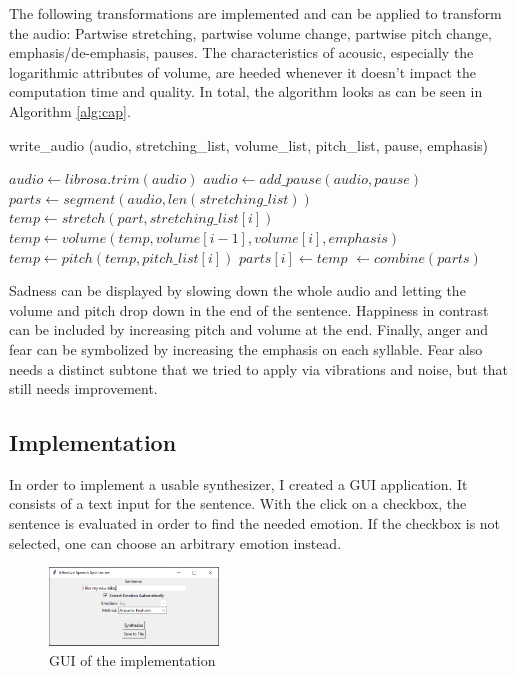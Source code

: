 \documentclass[11pt]{article}
\begin{document}
The following transformations are implemented and can be applied to transform the audio:
Partwise stretching, partwise volume change, partwise pitch change, emphasis/de-emphasis, pauses. The characteristics of acousic, especially the logarithmic attributes of volume, are heeded whenever it doesn't impact the computation time and quality.
In total, the algorithm looks as can be seen in Algorithm \ref{alg:cap}.


\begin{algorithm}
\caption{write\_audio (audio, stretching\_list, volume\_list, pitch\_list, pause, emphasis)}\label{alg:cap}
\begin{algorithmic}
\State $audio \gets librosa.trim(audio)$
	\State $audio  \gets  add\_pause(audio,pause)$
\EndIf
\State $parts \gets segment(audio,len(stretching\_list))$
\State $temp  \gets  stretch(part, stretching\_list[i])$ 
\State $temp \gets volume (temp, volume[i-1], volume[i], emphasis)$
\State $temp \gets pitch (temp, pitch\_list[i])$
\State $parts[i] \gets temp$
\EndFor
\State $\gets combine(parts)$
\end{algorithmic}
\end{algorithm}


Sadness can be displayed by slowing down the whole audio and letting the volume and pitch drop down in the end of the sentence. Happiness in contrast can be included by increasing pitch and volume at the end. Finally, anger and fear can be symbolized by increasing the emphasis on each syllable. Fear also needs a distinct subtone that we tried to apply via vibrations and noise, but that still needs improvement.


\subsection{Implementation}

In order to implement a usable synthesizer, I created a GUI application. It consists of a text input for the sentence. With the click on a checkbox, the sentence is evaluated in order to find the needed emotion. If the checkbox is not selected, one can choose an arbitrary emotion instead. 

\begin{figure}[h]
 \centering
\includegraphics[width=0.4\textwidth]{"Bilder/gui_v2.png"}
\caption{GUI of the implementation}
\end{figure}
\end{document}
